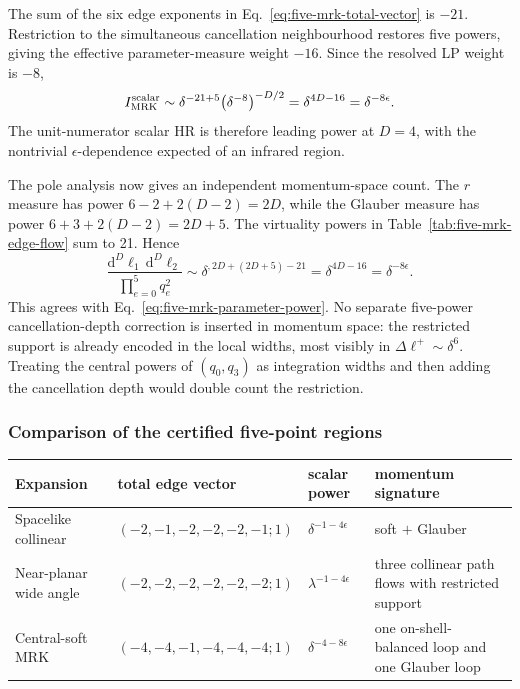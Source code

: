 \documentclass[a4paper,11pt]{article}
\newcommand{\dd}{\mathrm d}
\begin{document}
The sum of the six edge exponents in
Eq.~\eqref{eq:five-mrk-total-vector} is \(-21\).  Restriction to the
simultaneous cancellation neighbourhood restores five powers, giving the
effective parameter-measure weight \(-16\).  Since the resolved LP weight is
\(-8\),
\begin{equation}
 I_{\rm MRK}^{\rm scalar}\sim
 \delta^{-21+5}\bigl(\delta^{-8}\bigr)^{-D/2}
 =\delta^{4D-16}=\delta^{-8\epsilon}.
 \label{eq:five-mrk-parameter-power}
\end{equation}
The unit-numerator scalar HR is therefore leading power at \(D=4\), with the
nontrivial \(\epsilon\)-dependence expected of an infrared region.

The pole analysis now gives an independent momentum-space count.  The
\(r\) measure has power
\(6-2+2(D-2)=2D\), while the Glauber measure has power
\(6+3+2(D-2)=2D+5\).  The virtuality powers in
Table~\ref{tab:five-mrk-edge-flow} sum to 21.  Hence
\begin{equation}
 \frac{\dd^D\ell_1\,\dd^D\ell_2}
      {\prod_{e=0}^{5}q_e^2}
 \sim\delta^{,2D+(2D+5)-21}
 =\delta^{4D-16}=\delta^{-8\epsilon}.
 \label{eq:five-mrk-momentum-power}
\end{equation}
This agrees with Eq.~\eqref{eq:five-mrk-parameter-power}.  No separate
five-power cancellation-depth correction is inserted in momentum space: the
restricted support is already encoded in the local widths, most visibly in
\(\Delta\ell^+\sim\delta^6\).  Treating the central powers of \((q_0,q_3)\)
as integration widths and then adding the cancellation depth would double
count the restriction.

\fi
\subsubsection{Comparison of the certified five-point regions}

\begin{center}
\small
\begin{tabular}{@{}
 >{\raggedright\arraybackslash}p{}
 >{\centering\arraybackslash}p{}
 >{\centering\arraybackslash}p{}
 >{\raggedright\arraybackslash}p{}@{}}
\toprule
Expansion & total edge vector & scalar power & momentum signature\\
\midrule
Spacelike collinear &
\((-2,-1,-2,-2,-2,-1;1)\) &
\(\delta^{-1-4\epsilon}\) &
soft \(+\) Glauber\\
Near-planar wide angle &
\((-2,-2,-2,-2,-2,-2;1)\) &
\(\lambda^{-1-4\epsilon}\) &
three collinear path flows with restricted support\\
Central-soft MRK &
\((-4,-4,-1,-4,-4,-4;1)\) &
\(\delta^{-4-8\epsilon}\) &
one on-shell-balanced loop and one Glauber loop\\
\bottomrule
\end{tabular}
\end{center}
\end{document}
